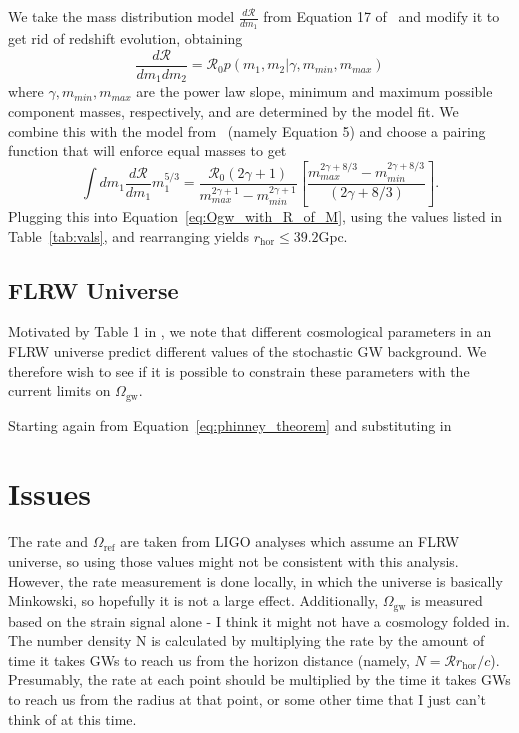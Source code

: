 \documentclass[]{article}
\newcommand{\Ogw}{\Omega_{\mathrm{gw}}}
\newcommand{\rhor}{r_{\text{hor}}}
\begin{document}
We take the mass distribution model $\frac{d\mathcal{R}}{dm_1}$ from Equation 17 of~\cite{O2_rates} and modify it to get rid of redshift evolution, obtaining
\begin{equation*}
\frac{d\mathcal{R}}{dm_1 dm_2} = \mathcal{R}_0 p(m_1, m_2 | \gamma, m_{min},m_{max})
\end{equation*}
where $\gamma, m_{min}, m_{max}$ are the power law slope, minimum and maximum possible component masses, respectively, and are determined by the model fit.
We combine this with the model from~\cite{picky_partners} (namely Equation 5) and choose a pairing function that will enforce equal masses to get
\begin{equation*}
\int d m_1 \frac{d\mathcal{R}}{dm_1} m_1 ^{5/3} = \frac{\mathcal{R}_0 (2\gamma +1)}{m_{max}^{2\gamma +1} - m_{min}^{2\gamma +1}} [\frac{m_{max}^{2\gamma +8/3} - m_{min}^{2\gamma +8/3}}{(2\gamma +8/3)}] . 
\end{equation*}
Plugging this into Equation~\ref{eq:Ogw_with_R_of_M}, using the values listed in Table~\ref{tab:vals}, and rearranging yields $\boxed{\rhor \leq 39.2 \mathrm{Gpc}}$. 

\subsection{FLRW Universe}
Motivated by Table 1 in \cite{Wesson_classical_olbers}, we note that different cosmological parameters in an FLRW universe predict different values of the stochastic GW background. 
We therefore wish to see if it is possible to constrain these parameters with the current limits on $\Ogw$. 

Starting again from Equation~\ref{eq:phinney_theorem} and substituting in 

\section{Issues}
The rate and $\Omega_{\text{ref}}$ are taken from LIGO analyses which assume an FLRW universe, so using those values might not be consistent with this analysis. 
However, the rate measurement is done locally, in which the universe is basically Minkowski, so hopefully it is not a large effect. 
Additionally, $\Ogw$ is measured based on the strain signal alone - I think it might not have a cosmology folded in.\\

The number density N is calculated by multiplying the rate by the amount of time it takes GWs to reach us from the horizon distance (namely, $N = \mathcal{R} r_{\text{hor}}/c$). Presumably, the rate at each point should be multiplied by the time it takes GWs to reach us from the radius at that point, or some other time that I just can't think of at this time.\\
\end{document}
